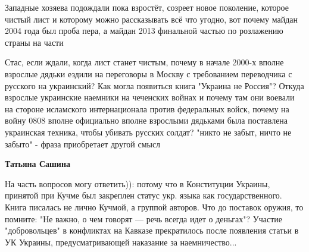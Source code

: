 \begin{itemize}
 

Западные хозяева подождали пока взростёт, созреет новое поколение, которое
чистый лист и которому можно рассказывать всё что угодно, вот почему майдан 2004
года был проба пера, а майдан 2013 финальной частью по розлажению страны на
части

\begin{itemize}
 

Стас, если ждали, когда лист станет чистым, почему в начале 2000-х вполне
взрослые дядьки ездили на переговоры в Москву с требованием переводчика с
русского на украинский? Как могла появиться книга "Украина не Россия"? Откуда
взрослые украинские наемники на чеченских войнах и почему там они воевали на
стороне исламского интернационала против федеральных войск, почему на войну
0808 вполне официально вполне взрослыми дядьками была поставлена украинская
техника, чтобы убивать русских солдат? "никто не забыт, ничто не забыто" -
фраза приобретает другой смысл


 
\textbf{Татьяна Сашина} 

На часть вопросов могу ответить)): потому что в Конституции Украины, принятой
при Кучме был закреплен статус укр. языка как государственного. Книга писалась
не лично Кучмой, а группой авторов. Что до поставок оружия, то помните: "Не
важно, о чем говорят — речь всегда идет о деньгах"? Участие "добровольцев" в
конфликтах на Кавказе прекратилось после появления статьи в УК Украины,
предусматривающей наказание за наемничество...

 

\end{itemize}
\end{itemize}
